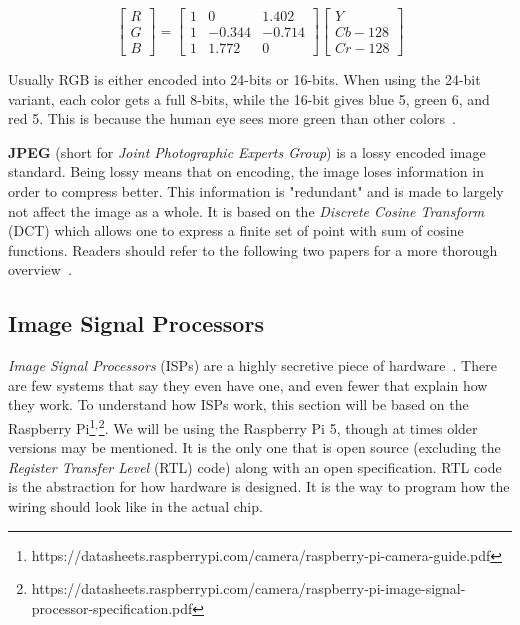 \[
\begin{bmatrix}
R \\
G \\
B
\end{bmatrix}
=
\begin{bmatrix}
1 & 0 & 1.402 \\
1 & -0.344 & -0.714 \\
1 & 1.772 & 0
\end{bmatrix}
\begin{bmatrix}
Y \\
Cb - 128 \\
Cr - 128
\end{bmatrix}
\]

Usually RGB is either encoded into 24-bits or 16-bits. When using the 24-bit
variant, each color gets a full 8-bits, while the 16-bit gives blue 5, green 6,
and red 5. This is because the human eye sees more green than other colors~\cite{davson2010human}.

\textbf{JPEG} (short for \textit{Joint Photographic Experts Group}) is a lossy
encoded image standard. Being lossy means that on encoding, the image loses
information in order to compress better. This information is "redundant" and is
made to largely not affect the image as a whole. It is based on the
\textit{Discrete Cosine Transform} (DCT) which allows one to express a finite
set of point with sum of cosine functions. Readers should refer to the
following two papers for a more thorough overview~\cite{wallace1991jpeg,
itu1993digital}.

\subsection{Image Signal Processors} \label{section:isp}
\textit{Image Signal Processors} (ISPs) are a highly secretive piece of
hardware~\cite{adams2010frankencamera}. There are few systems that say they even
have one, and even fewer that explain how they work. To understand how ISPs
work, this section will be based on the Raspberry Pi\footnote{\label{note:tuningguide}https://datasheets.raspberrypi.com/camera/raspberry-pi-camera-guide.pdf}$^,$\footnote{https://datasheets.raspberrypi.com/camera/raspberry-pi-image-signal-processor-specification.pdf}.
We will be using the Raspberry Pi 5, though at times older versions may be
mentioned. It is the only one that is open source (excluding the \textit{Register Transfer
Level} (RTL) code) along with an open specification. RTL code is the
abstraction for how hardware is designed. It is the way to program how the
wiring should look like in the actual chip.

